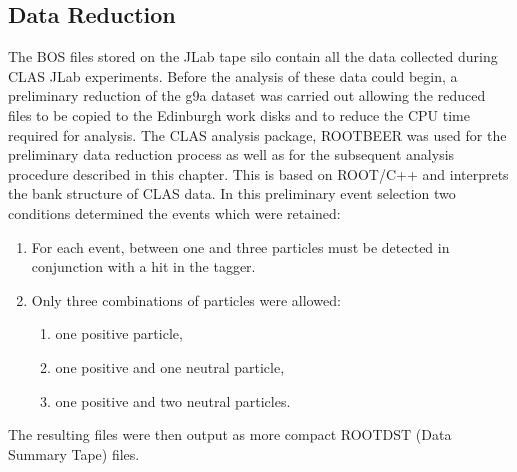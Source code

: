 \subsection{Data Reduction}
The BOS files stored on the JLab tape silo contain all the data collected during CLAS JLab experiments. Before the analysis of these data could begin, a preliminary reduction of the g9a dataset was carried out allowing the reduced files to be copied to the Edinburgh work disks and to reduce the CPU time required for analysis. The CLAS analysis package, ROOTBEER \cite{rootbeer} was used for the preliminary data reduction process as well as for the subsequent analysis procedure described in this chapter. This is based on ROOT/C++ and interprets the bank structure of CLAS data. In this preliminary event selection two conditions determined the events which were retained:
\begin{enumerate}
\item  For each event, between one and three particles must be detected in conjunction with a hit in the tagger.
\item  Only three combinations of particles were allowed:
  \begin{enumerate}
  \item one positive particle,
  \item one positive and one neutral particle,
  \item one positive and two neutral particles.
  \end{enumerate}
\end{enumerate}
The resulting files were then output as more compact ROOTDST (Data Summary Tape) files.

